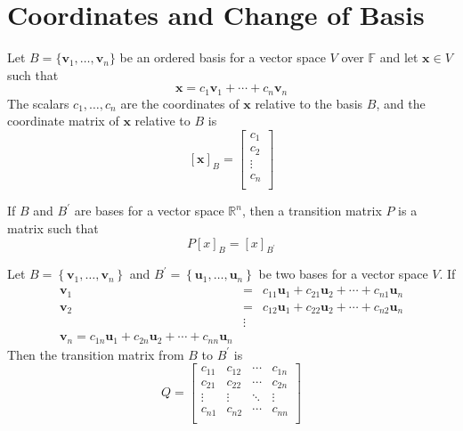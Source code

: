 \section{Coordinates and Change of Basis}
\begin{definition}
    Let \(B=\{ \mathbf{v}_1,\ldots,\mathbf{v}_n \} \) be an ordered basis for a vector space \(V\) over \(\mathbb{F} \) and let \(\mathbf{x}\in V\) such that 
    \[
        \mathbf{x}=c_1 \mathbf{v}_1 + \cdots + c_n \mathbf{v}_n
    \]
    The scalars \(c_1,\ldots,c_n\) are the coordinates of \(\mathbf{x}\) relative to the basis \(B\), and the coordinate matrix of \(\mathbf{x}\) relative to \(B\) is 
    \[
        [\mathbf{x}]_B = \begin{bmatrix}
             c_1 \\
              c_2\\
              \vdots\\
              c_n\\
        \end{bmatrix}
    \]
\end{definition}
\begin{definition}
    If \(B\) and \(B^{\prime} \) are bases for a vector space \(\mathbb{R}^n\), then a transition matrix \(P\) is a matrix such that
    \[
        P[x]_B = [x]_{B^{\prime} }
    \]
\end{definition}
\begin{lemma}
    Let \(B=\left\{ \mathbf{v}_1,\ldots,\mathbf{v}_n \right\} \) and \(B^{\prime} =\left\{ \mathbf{u}_1,\ldots,\mathbf{u}_n \right\} \) be two bases for a vector space \(V\). If
    \[
        \begin{array}{ccc}
            \mathbf{v}_1&=&c_{11}\mathbf{u}_1 + c_{21}\mathbf{u}_2 + \cdots+c_{n1}\mathbf{u}_n\\
            \mathbf{v}_2&=&c_{12}\mathbf{u}_1 +c_{22}\mathbf{u}_2+\cdots +c_{n2} \mathbf{u}_n \\
            &\vdots&\\
            \mathbf{v}_n = c_{1n}\mathbf{u}_1 + c_{2n}\mathbf{u}_2  + \cdots +c_{nn}\mathbf{u}_n 
        \end{array}
    \]
    Then the transition matrix from \(B\) to \(B^{\prime} \) is
    \[
        Q=\begin{bmatrix}
            c_{11}  &c_{12}   &\cdots  &c_{1n}    \\
             c_{21} &c_{22}   &\cdots  &   c_{2n} \\
             \vdots&\vdots  &\ddots  &\vdots   \\
             c_{n1} &c_{n2}   &\cdots  &c_{nn}    \\
        \end{bmatrix}
    \]
\end{lemma}
